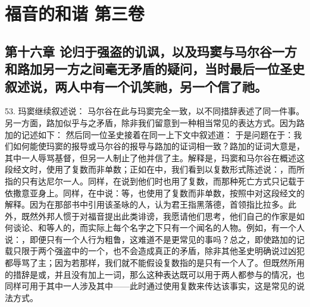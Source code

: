 

\section{福音的和谐 第三卷}


\subsection{第十六章 论归于强盗的讥讽，以及玛窦与马尔谷一方和路加另一方之间毫无矛盾的疑问，当时最后一位圣史叙述说，两人中有一个讥笑祂，另一个信了祂。}

53. 玛窦继续叙述说： 马尔谷在此与玛窦完全一致，以不同措辞表述了同一件事。另一方面，路加似乎与之矛盾，除非我们留意到一种相当常见的表达方式。因为路加的记述如下： 然后同一位圣史接着在同一上下文中叙述道： 于是问题在于：我们如何能使玛窦的报导或马尔谷的报导与路加的证词相一致？路加的证词大意是，其中一人辱骂基督，但另一人制止了他并信了主。解释是，玛窦和马尔谷在概述这段经文时，使用了复数而非单数；正如在中，我们看到以复数形式陈述说：，而所指的只有达尼尔一人。同样，在说到他们时也用了复数，而那种死亡方式只记载于依撒意亚身上。同样，在中说：等，也使用了复数而非单数，按照中对这段经文的解释。因为在那部书中引用该圣咏的人，认为君王指黑落德，首领指比拉多。此外，既然外邦人惯于对福音提出此类诽谤，我愿请他们思考，他们自己的作家是如何谈论、和等人的，而实际上每个名字之下只有一个闻名的人物。例如，有一个人说：，即便只有一个人行为粗鲁，这难道不是更常见的事吗？总之，即使路加的记载只限于两个强盗中的一个，也不会造成真正的矛盾，除非其他圣史明确说过凶犯都辱骂了主；因为若那样，我们就不能假设复数指的是只有一个人了。但既然所用的措辞是或，并且没有加上一词，那么这种表达既可以用于两人都参与的情况，也同样可用于其中一人涉及其中——此时通过使用复数来传达该事实，这是常见的说法方式。\par

